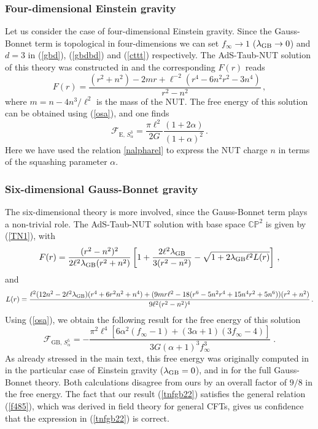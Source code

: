 \documentclass[12pt]{article}
\numberwithin{equation}{section}
\newcommand{\req}[1]{(\ref{#1})} %
\begin{document}
\subsubsection*{Four-dimensional Einstein gravity}
Let us consider the case of four-dimensional Einstein gravity. Since the Gauss-Bonnet term is topological in four-dimensions we can set $f_{\infty}\rightarrow 1$ ($\lambda_{\rm GB}\rightarrow 0$)  and $d=3$ in \req{gbd}, \req{gbdbd} and \req{cttt} respectively. The AdS-Taub-NUT solution of this theory was constructed in \cite{Chamblin:1998pz,Hawking:1998ct} and the corresponding $F(r)$ reads 
%
\begin{equation}\label{TN1n}
F(r)=\frac{(r^2+n^2)-2mr+\ell^{-2}(r^4-6n^2r^2-3n^4)}{r^2-n^2}\, ,
\end{equation}
%
where $m=n-4n^3/\ell^2$ is the mass of the NUT. The free energy of this solution can be obtained using \req{osa}, and one finds \cite{Emparan:1999pm}
%
\begin{equation}\label{tnf}
\mathcal{F}_{\textrm{E},\,S^3_{\alpha}}=\frac{\pi \ell^2}{2G}\frac{(1+2\alpha)}{(1+\alpha)^2}\, .
\end{equation}
%
Here we have used the relation \eqref{nalpharel} to express the NUT charge $n$ in terms of the squashing parameter $\alpha$.
 
\subsubsection*{Six-dimensional Gauss-Bonnet gravity} 
The six-dimensional theory is more involved, since the Gauss-Bonnet term plays a non-trivial role. The AdS-Taub-NUT solution with base space $\mathbb{CP}^2$ is given by \req{TN1}, with \cite{Dehghani:2005zm}
%
\begin{equation}\label{TN1ngb}
F(r)=\frac{(r^2-n^2)^2}{2\ell^2\lambda_{\rm GB}(r^2+n^2)}\left[1+\frac{2\ell^2\lambda_{\rm GB}}{3(r^2-n^2)}-\sqrt{1+2\lambda_{\rm GB}\ell^2L(r)} \right]\, ,
\end{equation}
%
and
%
\begin{equation}\label{TN1ngb}
L(r)=\frac{\ell^2(12 n^2-2\ell^2\lambda_{\rm GB})(r^4+6r^2n^2+n^4)+(9 m r \ell^2 -18(r^6-5 n^2 r^4 +15 n^4 r^2+5 n^6)) (r^2+n^2)}{9\ell^2(r^2-n^2)^4}  \, .
\end{equation}
%
Using \req{osa}, we obtain the following result for the free energy of this solution
%
\begin{equation}\label{tnfgb22}
\mathcal{F}_{\textrm{GB},\, S^{5}_{\alpha}}= -\frac{  \pi ^2 \ell^4\left[6\alpha ^2 (f_{\infty}-1)+(3\alpha+1)(3
	f_{\infty}-4)\right]}{3G (\alpha+1)^3 f_{\infty}^3 }\;.
\end{equation}
%
As already stressed in the main text, this free energy was originally computed in \cite{Clarkson:2002uj} in the particular case of Einstein gravity ($\lambda_{\rm GB}=0$), and in \cite{KhodamMohammadi:2008fh} for the full Gauss-Bonnet theory. Both calculations disagree from ours by an overall factor of $9/8$ in the free energy. The fact that our result \req{tnfgb22} satisfies the general relation \req{f485}, which was derived in field theory for general CFTs, gives us confidence that the expression in \req{tnfgb22} is correct.
\end{document}
